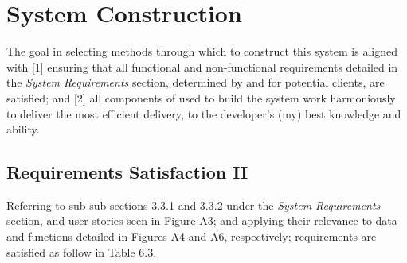 \documentclass[11pt, english]{article}
\begin{document}
\newpage

\section{System Construction}\label{ch6}

	The goal in selecting methods through which to construct this system is aligned with [1] ensuring that all functional and non-functional requirements detailed in the \textit{System Requirements} section, determined by and for potential clients, are satisfied; and [2] all components of used to build the system work harmoniously to deliver the most efficient delivery, to the developer's (my) best knowledge and ability.

	\subsection{Requirements Satisfaction II}

	Referring to sub-sub-sections 3.3.1 and 3.3.2 under the \textit{System Requirements} section, and user stories seen in Figure A3; and applying their relevance to data and functions detailed in Figures A4 and A6, respectively; requirements are satisfied as follow in Table 6.3.
\end{document}
